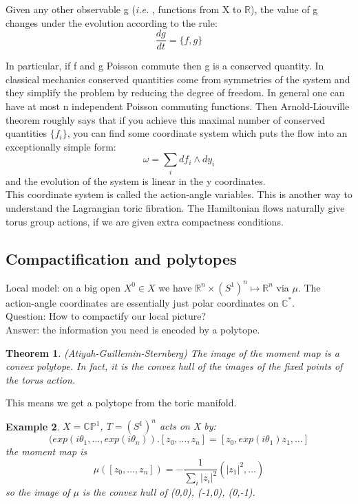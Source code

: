 \documentclass[a4paper]{article}
\newtheorem{thm}{Theorem}[section]
\newtheorem{eg}[thm]{Example}
\newcommand{\ie}{\emph{i.e.} }
\newcommand{\R}{\mathbb{R}}
\newcommand{\C}{\mathbb{C}}
\begin{document}
	Given any other observable g (\ie, functions from X to $\R$), the value of g changes under the evolution according to the rule: $$\frac{dg}{dt}=\{f,g\}$$
	
	In particular, if f and g Poisson commute then g is a conserved quantity. In classical mechanics conserved quantities come from symmetries of the system and they simplify the problem by reducing the degree of freedom. 
	In general one can have at most n independent Poisson commuting functions. Then Arnold-Liouville theorem roughly says that if you achieve this maximal number of conserved quantities $\{f_i\}$, you can find some coordinate system which puts the flow into an exceptionally simple form:
	$$ \omega=\sum_i{df_i \wedge dy_i}$$
	and the evolution of the system is linear in the y coordinates.\\
	
	This coordinate system is called the action-angle variables. This is another way to understand the Lagrangian toric fibration. The Hamiltonian flows naturally give torus group actions, if we are given extra compactness conditions.
	
	
	\subsection{Compactification and polytopes}
	
	Local model: on a big open $X^{0} \in X$ we have $\R^n \times (S^1)^n \mapsto \R^n$ via $\mu$. The action-angle coordinates are essentially just polar coordinates on $\C^*$. \\
	
	
	Question: How to compactify our local picture?\\
	
	Answer: the information you need is encoded by a polytope.
	
	
	\begin{thm}
		\rm (Atiyah-Guillemin-Sternberg) The image of the moment map is a convex polytope. In fact, it is the convex hull of the images of the fixed points of the torus action. 
	\end{thm}
	
	This means we get a polytope from the toric manifold.
	
	\begin{eg}
		$X=\C\mathbb{P}^1$, $T=(S^1)^n $ acts on X by:
		$$ (exp(i\theta_1, \ldots, exp(i\theta_n)).[z_0,\ldots, z_n]=[z_0, exp(i\theta_1)z_1, \ldots]$$
		the moment map is 
		$$\mu ([z_0,\ldots, z_n])=-\frac{1}{\sum_i{|z_i|^2}}(|z_1|^2, \ldots)$$
		so the image of $\mu$ is the convex hull of (0,0), (-1,0), (0,-1).
	\end{eg}
	
\end{document}
